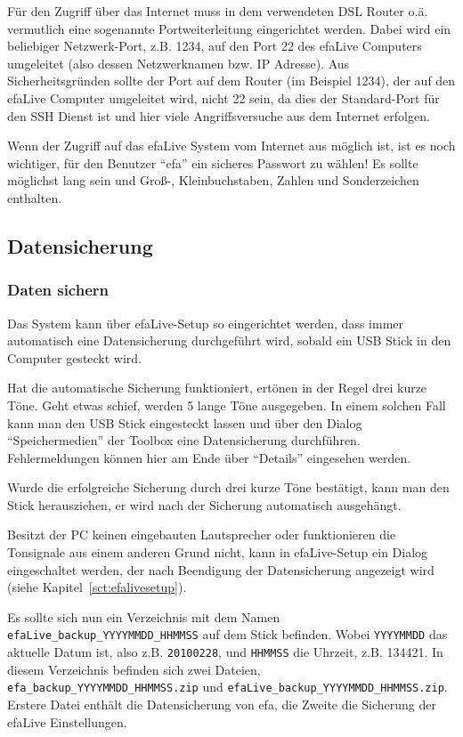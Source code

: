 \documentclass[a4paper,12pt,twoside]{article}
\begin{document}
Für den Zugriff über das Internet muss in dem verwendeten DSL Router
o.ä. vermutlich eine sogenannte Portweiterleitung eingerichtet werden.
Dabei wird ein beliebiger Netzwerk-Port, z.B. 1234, auf den Port 22 des
efaLive Computers umgeleitet (also dessen Netzwerknamen bzw. IP
Adresse). Aus Sicherheitsgründen sollte der Port auf dem Router (im
Beispiel 1234), der auf den efaLive Computer umgeleitet wird, nicht 22
sein, da dies der Standard-Port für den SSH Dienst ist und hier viele
Angriffsversuche aus dem Internet erfolgen.

Wenn der Zugriff auf das efaLive System vom Internet aus möglich ist,
ist es noch wichtiger, für den Benutzer
"`efa"' ein sicheres Passwort zu wählen! Es
sollte möglichst lang sein und Groß-, Kleinbuchstaben, Zahlen und
Sonderzeichen enthalten.


\subsection{Datensicherung}
\label{sct:datensicherung}
\subsubsection{Daten sichern}
\label{sct:daten_sichern}
Das System kann über efaLive-Setup
so eingerichtet werden, dass immer automatisch eine Datensicherung
durchgeführt wird, sobald ein USB Stick in den Computer gesteckt wird. 

Hat die automatische Sicherung funktioniert, ertönen in der Regel drei
kurze Töne. Geht etwas schief, werden 5 lange Töne ausgegeben. In einem
solchen Fall kann man den USB Stick eingesteckt lassen und über den
Dialog "`Speichermedien"' der Toolbox eine
Datensicherung durchführen. Fehlermeldungen können hier am Ende über
"`Details"' eingesehen werden.

Wurde die erfolgreiche Sicherung durch drei kurze Töne bestätigt, kann
man den Stick herausziehen, er wird nach der Sicherung automatisch
ausgehängt.

Besitzt der PC keinen eingebauten Lautsprecher oder funktionieren die
Tonsignale aus einem anderen Grund nicht, kann in efaLive-Setup ein
Dialog eingeschaltet werden, der nach Beendigung der Datensicherung
angezeigt wird (siehe Kapitel~\ref{sct:efalivesetup}).

Es sollte sich nun ein Verzeichnis mit dem Namen\\
\texttt{efaLive\_backup\_YYYYMMDD\_HHMMSS} auf dem
Stick befinden. Wobei \texttt{YYYYMMDD} das aktuelle Datum ist, also z.B.
\texttt{20100228}, und \texttt{HHMMSS} die Uhrzeit, z.B. 134421. In diesem Verzeichnis
befinden sich zwei Dateien,
\texttt{efa\_backup\_YYYYMMDD\_HHMMSS.zip} und
\texttt{efaLive\_backup\_YYYYMMDD\_HHMMSS.zip}.
Erstere Datei enthält die Datensicherung von efa, die Zweite die
Sicherung der efaLive Einstellungen.
\end{document}
